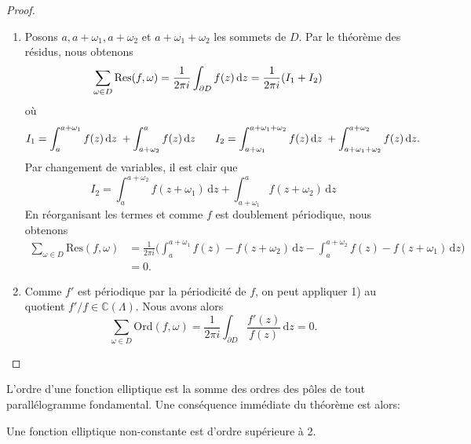\documentclass[a4paper]{article}
\begin{document}
\begin{proof}
\begin{enumerate}
\item Posons $a,a+\omega_{1},a+\omega_{2}$ et $a+\omega_{1}+\omega_{2}$ les sommets de $D$. Par le théorème des résidus, nous obtenons 
\begin{align*}
\noindent \sum \limits_{\omega \in D} \text{Res}(f,\omega) & = 
\frac{1}{2\pi i} \int_{\partial D}^{} f(z) \, \mathrm{d}z 
 =  \frac{1}{2\pi i} (I_{1}+I_{2})
\end{align*}
où \begin{equation*}
I_{1}=\int_{a}^{a+\omega_{1}} f(z) \, \mathrm{d}z \hspace{0.1cm} +\int_{a+\omega_{2}}^{a} f(z) \, \mathrm{d}z 
\hspace{0.65cm}
I_{2}=
\int_{a+\omega_{1}}^{a+\omega_{1}+\omega_{2}} f(z) \, \mathrm{d}z \hspace{0.1cm}+ \int_{a+\omega_{1}+\omega_{2}}^{a+\omega_{2}} f(z) \, \mathrm{d}z.
\end{equation*}
Par changement de variables, il est clair que
\begin{equation*}
I_{2}=\int_{a}^{a+\omega_{2}} f(z+\omega_{1}) \, \mathrm{d}z+\int_{a+\omega_{1}}^{a} f(z+\omega_{2}) \, \mathrm{d}z
\end{equation*}
En réorganisant les termes et comme $f$ est doublement périodique, nous obtenons
\begin{align*}
  \sum \limits_{\omega \in D} \text{Res}(f,\omega) & =  \frac{1}{2\pi i}\Big(\int_{a}^{a+\omega_{1}} f(z)-f(z+\omega_{2}) \, \mathrm{d}z -\int_{a}^{a+\omega_{2}} f(z)-f(z+\omega_{1}) \, \mathrm{d}z \Big) \\
   &=0.
\end{align*}
\item Comme $f'$ est périodique par la périodicité de $f$, on peut appliquer 1) au quotient  
$f'/f \in \mathbb{C}(\Lambda)$. Nous avons alors
\begin{equation*}
\sum \limits_{\omega \in D} \text{Ord}(f,\omega)=\frac{1}{2\pi i}\int_{\partial D}^{} \frac{f'(z)}{f(z)} \, \mathrm{d}z=0.
\end{equation*}
\end{enumerate}
\end{proof}

\noindent L'ordre d'une fonction elliptique est la somme des ordres des pôles de tout parallélogramme fondamental. Une conséquence immédiate du théorème est alors:

\begin{cor}
Une fonction elliptique non-constante est d'ordre supérieure à 2.
\end{cor}
\end{document}
